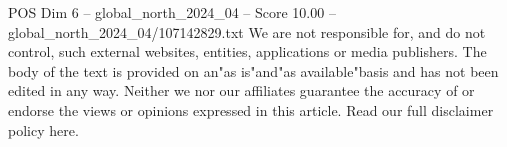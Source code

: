 \begin{textsample}{POS Dim 6 – global\_north\_2024\_04 – Score 10.00 – global\_north\_2024\_04/107142829.txt}
We are not responsible for, and do not control, such external websites, entities, applications or media publishers.
The body of the text is provided on an"as is"and"as available"basis and has not been edited in any way.
Neither we nor our affiliates guarantee the accuracy of or endorse the views or opinions expressed in this article.
Read our full disclaimer policy here.

\end{textsample}
